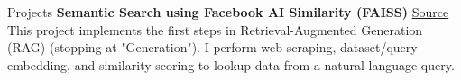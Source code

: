 \begin{rubric}{Projects}
\entry*[2024] \textbf{Semantic Search using Facebook AI Similarity (FAISS)} \hfill \href{https://github.com/NathanCorral/Hugging-Face-FAISS-Semantic-Search}{\faGithub Source} \newline
\qquad This project implements the first steps in Retrieval-Augmented Generation (RAG) (stopping at "Generation").  I perform web scraping, dataset/query embedding, and similarity scoring to lookup data from a natural language query.  


\begin{comment}
\entry*[2021] \textbf{Temporal Convolutional Network} \newline
As part of a class project, we re-implemented the Multi-Stage Temporal Convolutional Network\footnote{Y. Abu Farha et al., "MS-TCN: Multi-Stage Temporal Convolutional Network for Action Segmentation." CVPR 2019.} in PyTorch.  This project achieved: \newline
\vspace{\CVItemizeHeaderSpacing} \begin{itemize}
	\setlength{\itemsep}{\CVItemizeSpacing}
	\item Understanding state-of-the-art (2019) computer vision networks on video action classification.
	\item Training and testing the model on a subset of an actively used dataset ($\approx$30\% of the Breakfast Actions Dataset).
	\item Verifying results reported in the paper (66\% accuracy).
\end{itemize}


\entry*[2016] \textbf{Tower of Hanoi} \newline
I programmed a robot arm to play the Tower of Hanoi game with full automation.  The project goals consisted of:  \newline
\vspace{\CVItemizeHeaderSpacing} \begin{itemize}
	\setlength{\itemsep}{\CVItemizeSpacing}
	\item Calculating the Inverse Kinematics for a ROS Controlled Rhino RX2 arm, and programming them in C++.
	\item Attaching a down-facing camera and building a computer vision node to identify blocks in the robot plane.
	\item Establishing tower centers and programming the Tower of Hanoi game logic.
\end{itemize}


\end{comment}
\end{rubric}
